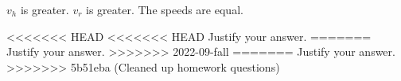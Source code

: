\documentclass{../../oss-apphys-exam}
\begin{document}
\begin{questions}
\begin{parts}
    \vspace{.2in}
    \underline{\hspace{.5in}} $v_h$ is greater.\hspace{.5in}
    \underline{\hspace{.5in}} $v_r$ is greater.\hspace{.5in}
    \underline{\hspace{.5in}} The speeds are equal.

<<<<<<< HEAD
<<<<<<< HEAD
    \vspace{.1in}Justify your answer.
=======
    \vspace{.2in}Justify your answer.
    \vspace{\stretch2}
>>>>>>> 2022-09-fall
=======
    \vspace{.2in}Justify your answer.
    \vspace{\stretch2}
>>>>>>> 5b51eba (Cleaned up homework questions)
  \end{parts}
\end{questions}
\end{document}
